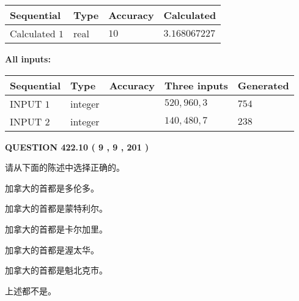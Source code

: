 \documentclass{ctexart}
\begin{document}
   
   
   
\noindent{}
   
   
  
  
\noindent\begin{tabular}{|l|l|l|l|}
\hline
 Sequential & Type & Accuracy & Calculated \\ 
\hline
 
 
  Calculated $  1 $ & real & $  10  $ & 
 $ 3.168067227 $ 
 \\  \hline  
 \end{tabular}
   
   
   
   
\noindent\vspace{0.1in}\hspace{-0.08in} {\textbf{\Large{All inputs: }}}
   
   
  
  
\noindent\begin{tabular}{|l|l|l|l|l|}
\hline
 Sequential & Type & Accuracy & Three inputs & Generated \\ 
\hline
 
 
  INPUT $  1 $ & integer &  & $
 520
 , 
 960
 , 
 3
 $ & $ 754 $ 
 \\  \hline  
 
 
  INPUT $  2 $ & integer &  & $
 140
 , 
 480
 , 
 7
 $ & $ 238 $ 
 \\  \hline  
 \end{tabular}
   
   
  
\vspace{0.2in}
  
{\textbf{\Large{QUESTION
422.10 
 ( 9 , 9 , 201 )
}}}
  
  
请从下面的陈述中选择正确的。
 
 
加拿大的首都是多伦多。
 
 
加拿大的首都是蒙特利尔。
 
 
加拿大的首都是卡尔加里。
 
 
加拿大的首都是渥太华。
 
 
加拿大的首都是魁北克市。
 
 
 上述都不是。
 
 
\noindent{}
 
\end{document}
